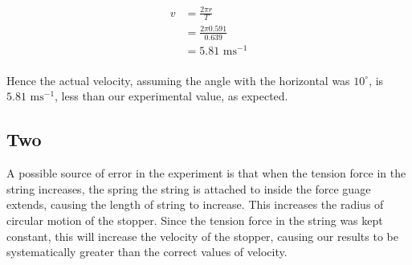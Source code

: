 \documentclass[a4paper,11pt]{article}
\begin{document}
\begin{align*}
	v & = \frac{2 \pi r}{T} \\
	  & = \frac{2 \pi 0.591}{0.639} \\
	  & = 5.81\mbox{ ms}^{-1} \\
\end{align*}

Hence the actual velocity, assuming the angle with the horizontal was
$10^\circ$, is $5.81\mbox{ ms}^{-1}$, less than our experimental value, as
expected.










\subsection{Two}

A possible source of error in the experiment is that when the tension force in the
string increases, the spring the string is attached to inside the force guage
extends, causing the length of string to increase. This increases the radius of
circular motion of the stopper. Since the tension force in the string was kept
constant, this will increase the velocity of the stopper, causing our results to
be systematically greater than the correct values of velocity. \\
\end{document}

